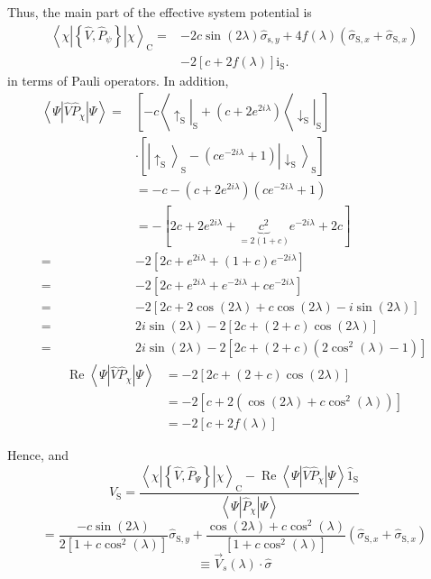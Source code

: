 Thus, the main part of the effective system potential is
$$
\begin{aligned}
\left\langle\chi\left|\left\{\hat{V}, \hat{P}_\psi\right\}\right| \chi\right\rangle_{\mathrm{C}}= & -2 c \sin (2 \lambda) \hat{\sigma}_{\mathrm{s}, y}+4 f(\lambda)\left(\hat{\sigma}_{\mathrm{S}, x}+\hat{\sigma}_{\mathrm{S}, x}\right) \\
& -2[c+2 f(\lambda)] \mathrm{i}_{\mathrm{S}} .
\end{aligned}
$$
in terms of Pauli operators. In addition,
$$
\begin{aligned}
\left\langle\Psi\left|\hat{V} \hat{P}_\chi\right| \Psi\right\rangle= & {\left[-c\left\langle\left.\uparrow_{\mathrm{S}}\right|_{\mathrm{S}}+\left(c+2 e^{2 i \lambda}\right)\left\langle\left.\downarrow_{\mathrm{S}}\right|_{\mathrm{S}}\right]\right.\right.} \\
& \cdot\left[\left|\uparrow_{\mathrm{S}}\right\rangle_{\mathrm{S}}-\left(c e^{-2 i \lambda}+1\right)\left|\downarrow_{\mathrm{S}}\right\rangle_{\mathrm{S}}\right] \\
& =-c-\left(c+2 e^{2 i \lambda}\right)\left(c e^{-2 i \lambda}+1\right) \\
& =-[2 c+2 e^{2 i \lambda}+\underbrace{c^2}_{=2(1+c)} e^{-2 i \lambda}+2 c] \\
= & -2\left[2 c+e^{2 i \lambda}+(1+c) e^{-2 i \lambda}\right] \\
= & -2\left[2 c+e^{2 i \lambda}+e^{-2 i \lambda}+c e^{-2 i \lambda}\right] \\
= & -2[2 c+2 \cos (2 \lambda)+c \cos (2 \lambda)-i \sin (2 \lambda)] \\
= & 2 i \sin (2 \lambda)-2[2 c+(2+c) \cos (2 \lambda)] \\
= & 2 i \sin (2 \lambda)-2\left[2 c+(2+c)\left(2 \cos ^2(\lambda)-1\right)\right]
\end{aligned}
$$
$$
\begin{aligned}
\operatorname{Re}\left\langle\Psi\left|\hat{V} \hat{P}_\chi\right| \Psi\right\rangle & =-2[2 c+(2+c) \cos (2 \lambda)] \\
& =-2\left[c+2\left(\cos (2 \lambda)+c \cos ^2(\lambda)\right)\right] \\
& =-2[c+2 f(\lambda)]
\end{aligned}
$$

Hence,
and
$$
\hat{V}_{\mathrm{S}}=\frac{\left\langle\chi\left|\left\{\hat{V}, \hat{P}_{\Psi}\right\}\right| \chi\right\rangle_{\mathrm{C}}-\operatorname{Re}\left\langle\Psi\left|\hat{V} \hat{P}_\chi\right| \Psi\right\rangle \hat{1}_{\mathrm{S}}}{\left\langle\Psi\left|\hat{P}_\chi\right| \Psi\right\rangle}
$$
$$
=\frac{-c \sin (2 \lambda)}{2\left[1+c \cos ^2(\lambda)\right]} \hat{\sigma}_{\mathrm{S}, y}+\frac{\cos (2 \lambda)+c \cos ^2(\lambda)}{\left[1+c \cos ^2(\lambda)\right]}\left(\hat{\sigma}_{\mathrm{S}, x}+\hat{\sigma}_{\mathrm{S}, x}\right)
$$
$$
\equiv \vec{V}_s(\lambda) \cdot \hat{\sigma}
$$
